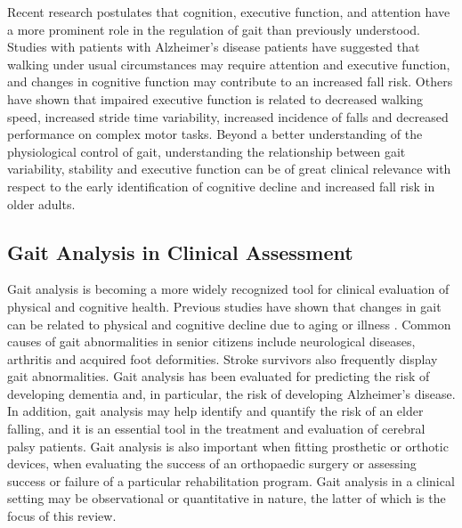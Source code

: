 \documentclass[11pt, oneside]{report}   	%
\begin{document}
Recent research postulates that cognition, executive function, and attention have a more prominent role in the regulation of gait than previously understood\cite{Yogev-Seligmann2008}. Studies with patients with Alzheimer's disease patients have suggested that walking under usual circumstances may require attention and executive function, and changes in cognitive function may contribute to an increased fall risk\cite{Sheridan2007}. Others have shown that impaired executive function is related to decreased walking speed\cite{Persad2008}, increased stride time variability\cite{Allali2008}, increased incidence of falls and decreased performance on complex motor tasks\cite{Yogev-Seligmann2008}. Beyond a better understanding of the physiological control of gait, understanding the relationship between gait variability, stability and executive function can be of great clinical relevance with respect to the early identification of cognitive decline and increased fall risk in older adults\cite{IJmker2012}.

\subsection{Gait Analysis in Clinical Assessment}

Gait analysis is becoming a more widely recognized tool for clinical evaluation of physical and cognitive health. Previous studies have shown that changes in gait can be related to physical and cognitive decline\cite{Kluger2008} due to aging or illness \cite{Grabiner2001,Hausdorff2005a}. Common causes of gait abnormalities in senior citizens include neurological diseases, arthritis and acquired foot deformities\cite{Verghese2002}. Stroke survivors also frequently display gait abnormalities\cite{Patterson2008}. Gait analysis has been evaluated for predicting the risk of developing dementia and, in particular, the risk of developing Alzheimer's disease\cite{Verghese2002}. In addition, gait analysis may help identify and quantify the risk of an elder falling\cite{Toulotte2006}, and it is an essential tool in the treatment and evaluation of cerebral palsy patients\cite{Gage1993}. Gait analysis is also important when fitting prosthetic or orthotic devices, when evaluating the success of an orthopaedic surgery\cite{Aminian2004} or assessing success or failure of a particular rehabilitation program\cite{SantAnna2009}. Gait analysis in a clinical setting may be observational or quantitative in nature, the latter of which is the focus of this review.
\end{document}
